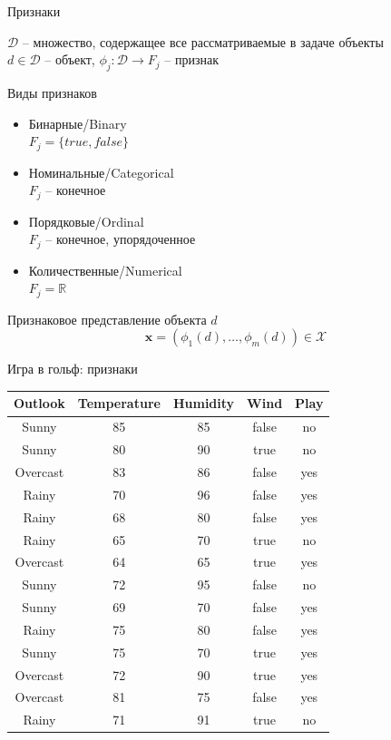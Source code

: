 \documentclass[aspectratio=169]{beamer}
\begin{document}
\begin{frame}{Признаки}

$\mathcal{D}$ -- множество, содержащее все рассматриваемые в задаче объекты \\
$d \in \mathcal{D}$ --  объект,  $\phi_j: \mathcal{D} \rightarrow F_j$ -- признак

\vspace{1em}
Виды признаков
\begin{itemize}
\item Бинарные/Binary \\ $F_j = \{true, false\}$
\item Номинальные/Categorical \\ $F_j$ -- конечное
\item Порядковые/Ordinal \\ $F_j$ -- конечное, упорядоченное
\item Количественные/Numerical \\ $F_j = \mathbb{R}$
\end{itemize}
\vspace{1em}
Признаковое представление объекта $d$
\[
\mathbf{x} = (\phi_1(d), \ldots, \phi_m(d)) \in \mathcal{X}
\]


\end{frame}

\begin{frame}{Игра в гольф: признаки}

\begin{center}
\begin{tabular}{c | c | c | c | c }
\bf Outlook & \bf Temperature & \bf Humidity & \bf Wind & \bf Play \\
\hline
Sunny & 85 & 85 & false & no \\
Sunny & 80 & 90 & true & no \\
Overcast & 83 & 86 & false & yes \\
Rainy & 70 & 96 & false & yes \\
Rainy & 68 & 80 & false & yes \\
Rainy & 65 & 70 & true & no \\
Overcast & 64 & 65 & true & yes \\
Sunny & 72 & 95 & false & no \\
Sunny & 69 & 70 & false & yes \\
Rainy & 75 & 80 & false & yes \\
Sunny & 75 & 70 & true & yes \\
Overcast & 72 & 90 & true & yes \\
Overcast & 81 & 75 & false & yes \\
Rainy & 71 & 91 & true & no \\
\end{tabular}
\end{center}

\end{frame}
\end{document}
